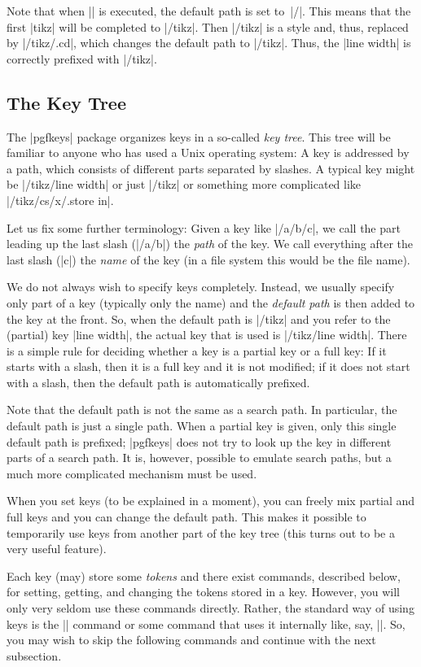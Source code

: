 Note that when |\pgfkeys| is executed, the default path is set to~|/|. This
means that the first |tikz| will be completed to |/tikz|. Then |/tikz| is a
style and, thus, replaced by |/tikz/.cd|, which changes the default path to
|/tikz|. Thus, the |line width| is correctly prefixed with |/tikz|.


\subsection{The Key Tree}

The |pgfkeys| package organizes keys in a so-called \emph{key tree}. This tree
will be familiar to anyone who has used a Unix operating system: A key is
addressed by a path, which consists of different parts separated by slashes. A
typical key might be |/tikz/line width| or just |/tikz| or something more
complicated like |/tikz/cs/x/.store in|.

Let us fix some further terminology: Given a key like |/a/b/c|, we call the
part leading up the last slash (|/a/b|) the \emph{path} of the key. We call
everything after the last slash (|c|) the \emph{name} of the key (in a file
system this would be the file name).

We do not always wish to specify keys completely. Instead, we usually specify
only part of a key (typically only the name) and the \emph{default path} is
then added to the key at the front. So, when the default path is |/tikz| and
you refer to the (partial) key |line width|, the actual key that is used is
|/tikz/line width|. There is a simple rule for deciding whether a key is a
partial key or a full key: If it starts with a slash, then it is a full key and
it is not modified; if it does not start with a slash, then the default path is
automatically prefixed.

Note that the default path is not the same as a search path. In particular, the
default path is just a single path. When a partial key is given, only this
single default path is prefixed; |pgfkeys| does not try to look up the key in
different parts of a search path. It is, however, possible to emulate search
paths, but a much more complicated mechanism must be used.

When you set keys (to be explained in a moment), you can freely mix partial and
full keys and you can change the default path. This makes it possible to
temporarily use keys from another part of the key tree (this turns out to be a
very useful feature).

Each key (may) store some \emph{tokens} and there exist commands, described
below, for setting, getting, and changing the tokens stored in a key. However,
you will only very seldom use these commands directly. Rather, the standard way
of using keys is the |\pgfkeys| command or some command that uses it internally
like, say, |\tikzset|. So, you may wish to skip the following commands and
continue with the next subsection.

